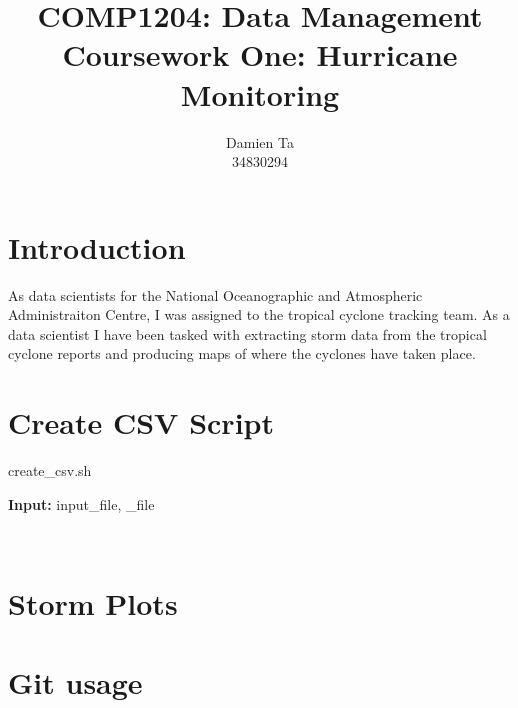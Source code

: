 \documentclass[]{article}
\title{COMP1204: Data Management \\ Coursework One: Hurricane Monitoring }
\author{Damien Ta \\ 34830294}
\begin{document}
\maketitle

\section{Introduction}
As data scientists for the National Oceanographic and Atmospheric Administraiton Centre, I was assigned to the tropical cyclone
tracking team. As a data scientist I have been tasked with extracting storm data from the tropical cyclone reports and producing
maps of where the cyclones have taken place.
\section{Create CSV Script}
\begin{algorithm}
    \caption{create\_csv.sh}
    \begin{algorithmic}
        \STATE \textbf{Input:} input\_file, \_file
    \end{algorithmic}
\end{algorithm}

\begin{verbatim}
    
\end{verbatim}
\section{Storm Plots}

\section{Git usage}
\end{document}
